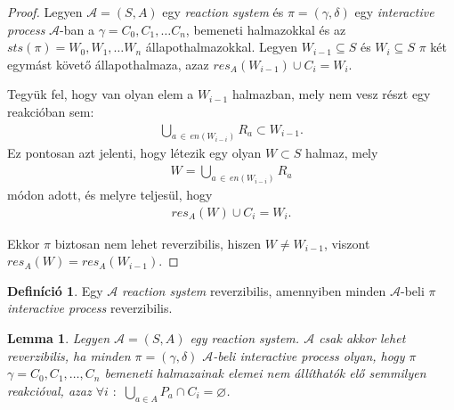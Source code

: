 \documentclass[12pt]{article}
\theoremstyle{definition}
\newtheorem*{definition*}{Definíció}
\theoremstyle{remark}
\theoremstyle{plain}
\theoremstyle{plain}
\newtheorem*{lemma*}{Lemma}
\let\emptyset\varnothing
\newcommand{\res}{\textit{res}}
\begin{document}
    \begin{proof}
        Legyen $\mathscr{A} = (S, A)$ egy \textit{reaction system} és $\pi=(\gamma, \delta)$ egy \textit{interactive process} $\mathscr{A}$-ban a $\gamma = C_{0}, C_{1}, \ldots C_{n}$, bemeneti halmazokkal és az $\textit{sts}(\pi)=W_{0},W_{1},\ldots W_{n}$ állapothalmazokkal. Legyen $W_{i - 1} \subseteq S$ és $W_{i} \subseteq S$ $\pi$ két egymást követő állapothalmaza, azaz $\res_{A}(W_{i-1}) \cup C_{i}=W_{i}$.
        
        Tegyük fel, hogy van olyan elem a $W_{i-1}$ halmazban, mely nem vesz részt egy reakcióban sem:
        \begin{align*}
            \bigcup_{a \,\in\, \textit{en}(W_{i-i})} R_{a} \subset W_{i-1}.
        \end{align*}
        Ez pontosan azt jelenti, hogy létezik egy olyan $W \subset S$ halmaz, mely
        \begin{align*}
            W = \bigcup_{a \,\in\, \textit{en}(W_{i-i})} R_{a}
        \end{align*}
        módon adott, és melyre teljesül, hogy
        \begin{align*}
            \res_{A}(W) \cup C_{i} = W_{i}.
        \end{align*}

        Ekkor $\pi$ biztosan nem lehet reverzibilis, hiszen $W \neq W_{i - 1}$, viszont $\res_{A}(W) = \res_{A}(W_{i - 1})$.
    \end{proof}

    \begin{definition*}
        Egy $\mathscr{A}$ \textit{reaction system} reverzibilis, amennyiben minden $\mathscr{A}$-beli $\pi$ \textit{interactive process} reverzibilis.
    \end{definition*}

    \begin{lemma*}
        Legyen $\mathscr{A} = (S, A)$ egy \textit{reaction system}. $\mathscr{A}$ csak akkor lehet reverzibilis, ha minden $\pi = (\gamma, \delta)$ $\mathscr{A}$-beli \textit{interactive process} olyan, hogy $\pi$ $\gamma = C_{0}, C_{1}, \ldots, C_{n}$ bemeneti halmazainak elemei nem állíthatók elő semmilyen reakcióval, azaz $\forall i$ $:$ $\bigcup_{a \in A} P_{a} \cap C_{i} = \emptyset$.
    \end{lemma*}
\end{document}

